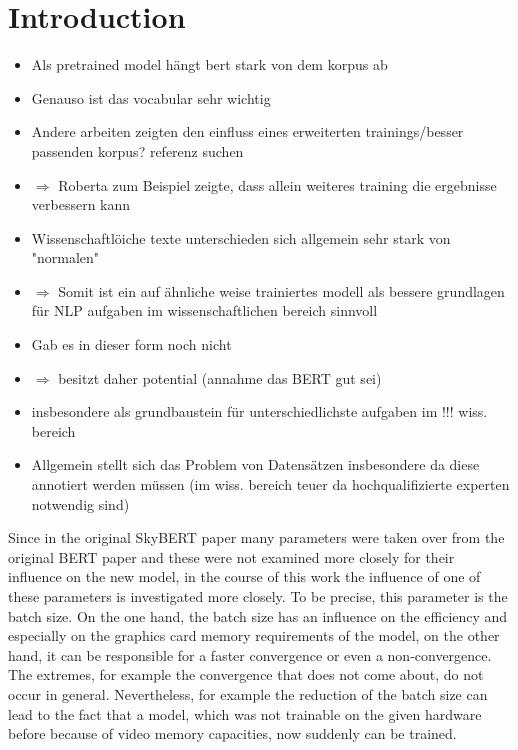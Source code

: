 \chapter{Introduction}
\color{ForestGreen}
\begin{itemize}
	\item Als pretrained model hängt bert stark von dem korpus ab
	\item Genauso ist das vocabular sehr wichtig
	\item Andere arbeiten zeigten den einfluss eines erweiterten trainings/besser passenden korpus? referenz suchen
	\item $\Longrightarrow$ Roberta zum Beispiel zeigte, dass allein weiteres training die ergebnisse verbessern kann
	\item Wissenschaftlöiche texte unterschieden sich allgemein sehr stark von "normalen"
	\item $\Rightarrow$ Somit ist ein auf ähnliche weise trainiertes modell als bessere grundlagen für NLP aufgaben im wissenschaftlichen bereich sinnvoll
	\item Gab es in dieser form noch nicht
	\item $\Rightarrow$ besitzt daher potential (annahme das BERT gut sei)
	\item insbesondere als grundbaustein für unterschiedlichste aufgaben im !!! wiss. bereich
	\item Allgemein stellt sich das Problem von Datensätzen insbesondere da diese annotiert werden müssen (im wiss. bereich teuer da hochqualifizierte experten notwendig sind)
\end{itemize}
\color{black}
Since in the original SkyBERT paper many parameters were taken over from the original BERT paper and these were not examined more closely for their influence on the new model, in the course of this work the influence of one of these parameters is investigated more closely. To be precise, this parameter is the batch size. On the one hand, the batch size has an influence on the efficiency and especially on the graphics card memory requirements of the model, on the other hand, it can be responsible for a faster convergence or even a non-convergence. The extremes, for example the convergence that does not come about, do not occur in general. Nevertheless, for example the reduction of the batch size can lead to the fact that a model, which was not trainable on the given hardware before because of video memory capacities, now suddenly can be trained.
